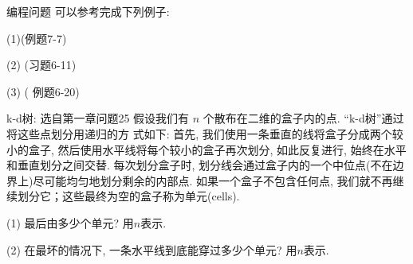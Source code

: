 \begin{exercise}{编程问题}
    可以参考完成下列例子: 

(1)(\cite{liu2014}例题7-7)

(2) (\cite{liu2014}习题6-11)

(3) (\cite{liu2014} 例题6-20)
    
\end{exercise}

\begin{exercise}{k-d树: 选自\cite{algobook}第一章问题25}
    假设我们有 $n$ 个散布在二维的盒子内的点. ``k-d树''通过将这些点划分用递归的方
    式如下: 首先, 我们使用一条垂直的线将盒子分成两个较小的盒子, 然后使用水平线将每个较小的盒子再次划分, 如此反复进行, 始终在水平和垂直划分之间交替. 每次划分盒子时, 划分线会通过盒子内的一个中位点(不在边界上)尽可能均匀地划分剩余的内部点. 如果一个盒子不包含任何点, 我们就不再继续划分它；这些最终为空的盒子称为单元(cells). 

    (1) 最后由多少个单元? 用$n$表示.  

    (2) 在最坏的情况下, 一条水平线到底能穿过多少个单元? 用$n$表示. 
\end{exercise}